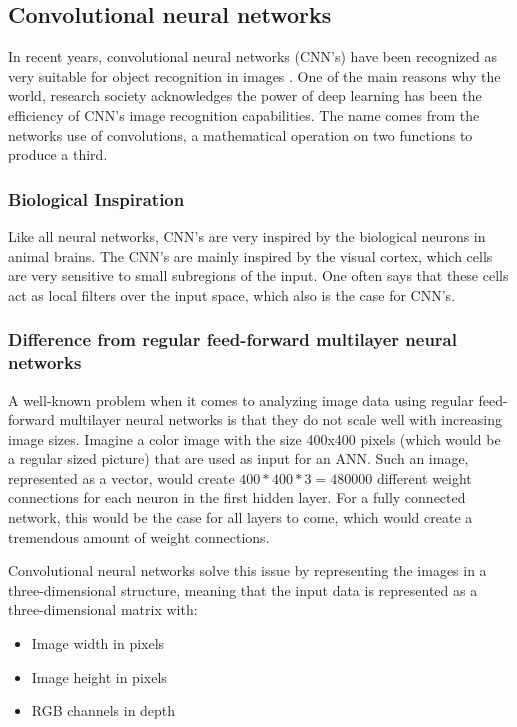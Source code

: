 \subsection{Convolutional neural networks}
In recent years, convolutional neural networks (CNN's) have been recognized as very suitable for object recognition in images \cite{Patterson2017}. One of the main reasons why the world, research society acknowledges the power of deep learning has been the efficiency of CNN's image recognition capabilities. The name comes from the networks use of convolutions, a mathematical operation on two functions to produce a third.

\subsubsection{Biological Inspiration}
Like all neural networks, CNN's are very inspired by the biological neurons in animal brains. The CNN's are mainly inspired by the visual cortex, which cells are very sensitive to small subregions of the input. One often says that these cells act as local filters over the input space, which also is the case for CNN's.

\subsubsection{Difference from regular feed-forward multilayer neural networks}
A well-known problem when it comes to analyzing image data using regular feed-forward multilayer neural networks is that they do not scale well with increasing image sizes. Imagine a color image with the size 400x400 pixels (which would be a regular sized picture) that are used as input for an ANN. Such an image, represented as a vector, would create $400*400*3=480 000$ different weight connections for each neuron in the first hidden layer. For a fully connected network, this would be the case for all layers to come, which would create a tremendous amount of weight connections.

Convolutional neural networks solve this issue by representing the images in a three-dimensional structure, meaning that the input data is represented as a three-dimensional matrix with:

\begin{itemize}
	\item Image width in pixels
	\item Image height in pixels
	\item RGB channels in depth
\end{itemize}

